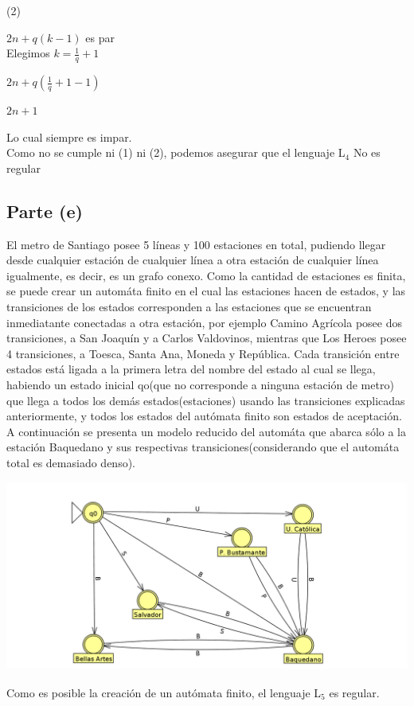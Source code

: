 \documentclass[11pt,letterpaper]{article}
\begin{document}
(2) 

$2n+q(k-1)$ es par
 \\
 
Elegimos $k = \frac{1}{q} + 1$

$2n+q(\frac{1}{q} + 1 -1)$

$2n+1$

Lo cual siempre es impar.
 \\

Como no se cumple ni (1) ni (2), podemos asegurar que el lenguaje L$_{4}$ No es regular


\subsection{Parte (e)}
El metro de Santiago posee 5 líneas y 100 estaciones en total, pudiendo llegar desde cualquier estación de cualquier línea a otra estación de cualquier línea igualmente, es decir, es un grafo conexo. Como la cantidad de estaciones es finita, se puede crear un automáta finito en el cual las estaciones hacen de estados, y las transiciones de los estados corresponden a las estaciones que se encuentran inmediatante conectadas a otra estación, por ejemplo Camino Agrícola posee dos transiciones, a San Joaquín y a Carlos Valdovinos, mientras que Los Heroes posee 4 transiciones, a Toesca, Santa Ana, Moneda y República. Cada transición entre estados está ligada a la primera letra del nombre del estado al cual se llega, habiendo un estado inicial qo(que no corresponde a ninguna estación de metro) que llega a todos los demás estados(estaciones) usando las transiciones explicadas anteriormente, y todos los estados del autómata finito son estados de aceptación. A continuación se presenta un modelo reducido del automáta que abarca sólo a la estación Baquedano y sus respectivas transiciones(considerando que el automáta total es demasiado denso).
 \\
\includegraphics[height=7cm]{tarea_3-e.png}
 \\
Como es posible la creación de un autómata finito, el lenguaje L$_{5}$ es regular.
\end{document}
